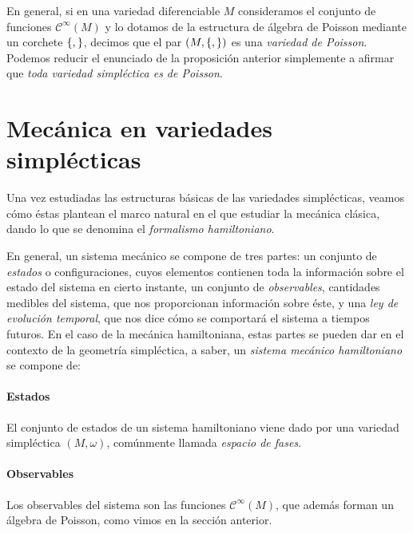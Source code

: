   En general, si en una variedad diferenciable $M$ consideramos el conjunto de funciones $\mathcal{C}^{\infty}(M)$ y lo dotamos de la estructura de álgebra de Poisson mediante un corchete $\left\lbrace , \right\rbrace$, decimos que el par $(M,\left\lbrace , \right\rbrace)$ es una \emph{variedad de Poisson}. Podemos reducir el enunciado de la proposición anterior simplemente a afirmar que \emph{toda variedad simpléctica es de Poisson}.

  \section{Mecánica en variedades simplécticas}
Una vez estudiadas las estructuras básicas de las variedades simplécticas, veamos cómo éstas plantean el marco natural en el que estudiar la mecánica clásica, dando lo que se denomina el \emph{formalismo hamiltoniano}. 

En general, un sistema mecánico se compone de tres partes: un conjunto de \emph{estados} o configuraciones, cuyos elementos contienen toda la información sobre el estado del sistema en cierto instante, un conjunto de \emph{observables}, cantidades medibles del sistema, que nos proporcionan información sobre éste, y una \emph{ley de evolución temporal}, que nos dice cómo se comportará el sistema a tiempos futuros. En el caso de la mecánica hamiltoniana, estas partes se pueden dar en el contexto de la geometría simpléctica, a saber, un \emph{sistema mecánico hamiltoniano} se compone de:

\paragraph{\textbf{Estados}} El conjunto de estados de un sistema hamiltoniano viene dado por una variedad simpléctica $(M,\omega)$, comúnmente llamada \emph{espacio de fases}.

\paragraph{\textbf{Observables}} Los observables del sistema son las funciones $\mathcal{C}^{\infty}(M)$, que además forman un álgebra de Poisson, como vimos en la sección anterior.

